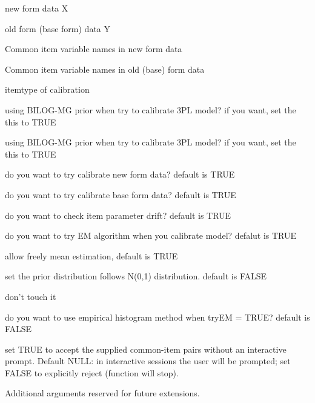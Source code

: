 \documentclass[letterpaper]{book}
\begin{document}
%
\begin{Arguments}
\begin{ldescription}
\item[\code{newformXData}] new form data X

\item[\code{oldformYData}] old form (base form) data Y

\item[\code{newformCommonItemNames}] Common item variable names in new form data

\item[\code{oldformCommonItemNames}] Common item variable names in old (base) form data

\item[\code{itemtype}] itemtype of calibration

\item[\code{newformBILOGprior}] using BILOG-MG prior when try to calibrate 3PL model? if you want, set the this to TRUE

\item[\code{oldformBILOGprior}] using BILOG-MG prior when try to calibrate 3PL model? if you want, set the this to TRUE

\item[\code{tryFitwholeNewItems}] do you want to try calibrate new form data? default is TRUE

\item[\code{tryFitwholeOldItems}] do you want to try calibrate base form data? default is TRUE

\item[\code{checkIPD}] do you want to check item parameter drift? default is TRUE

\item[\code{tryEM}] do you want to try EM algorithm when you calibrate model? defalut is TRUE

\item[\code{freeMEAN}] allow freely mean estimation, default is TRUE

\item[\code{forceNormalZeroOne}] set the prior distribution follows N(0,1) distribution. default is FALSE

\item[\code{parameterOverwrite}] don't touch it

\item[\code{empiricalhist}] do you want to use empirical histogram method when tryEM = TRUE? default is FALSE

\item[\code{confirmCommonItems}] set TRUE to accept the supplied common-item pairs without an interactive prompt. Default NULL: in interactive sessions the user will be prompted; set FALSE to explicitly reject (function will stop).

\item[\code{...}] Additional arguments reserved for future extensions.
\end{ldescription}
\end{Arguments}
\end{document}
